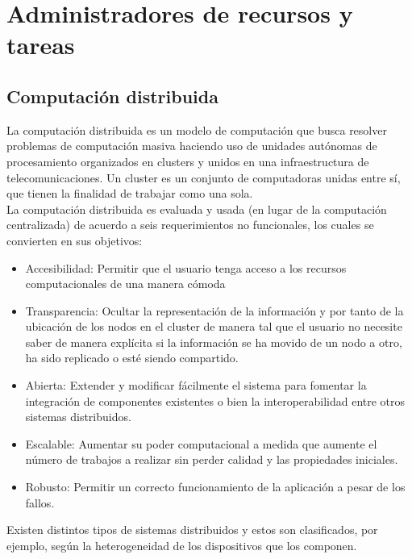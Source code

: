 \section{Administradores de recursos y tareas}

\subsection{Computación distribuida}
La computación distribuida es un modelo de computación que busca resolver problemas de computación masiva haciendo uso de unidades autónomas de procesamiento organizados en clusters y unidos en una infraestructura de telecomunicaciones. Un cluster es un conjunto de computadoras unidas entre sí, que tienen la finalidad de trabajar como una sola. \\

La computación distribuida es evaluada y usada (en lugar de la computación centralizada) de acuerdo a seis requerimientos no funcionales, los cuales se convierten en sus objetivos:

\begin{itemize}
\item Accesibilidad: Permitir que el usuario tenga acceso a los recursos computacionales de una manera cómoda
\item Transparencia: Ocultar la representación de la información y por tanto de la ubicación de los nodos en el cluster de manera tal que el usuario no necesite saber de manera explícita si la información se ha movido de un nodo a otro, ha sido replicado o esté siendo compartido.
\item Abierta: Extender y modificar fácilmente el sistema para fomentar la integración de componentes existentes o bien la interoperabilidad entre otros sistemas distribuidos.
\item Escalable: Aumentar su poder computacional a medida que aumente el número de trabajos a realizar sin perder calidad y las propiedades iniciales.
\item Robusto: Permitir un correcto funcionamiento de la aplicación a pesar de los fallos.
\end{itemize}

Existen distintos tipos de sistemas distribuidos y estos son clasificados, por ejemplo, según la heterogeneidad de los dispositivos que los componen. \\

